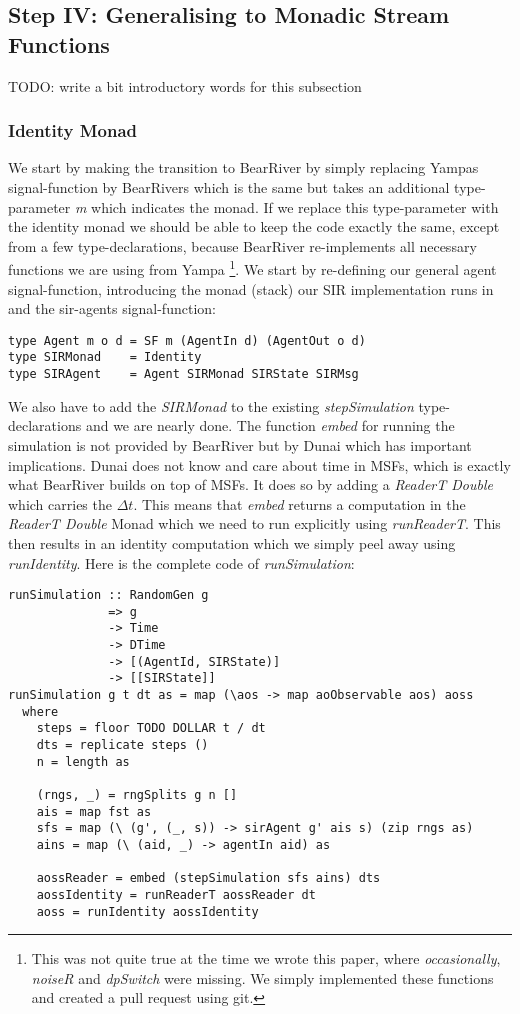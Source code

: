 \subsection{Step IV: Generalising to Monadic Stream Functions}
TODO: write a bit introductory words for this subsection

\subsubsection{Identity Monad}
We start by making the transition to BearRiver by simply replacing Yampas signal-function by BearRivers which is the same but takes an additional type-parameter \textit{m} which indicates the monad. If we replace this type-parameter with the identity monad we should be able to keep the code exactly the same, except from a few type-declarations, because BearRiver re-implements all necessary functions we are using from Yampa \footnote{This was not quite true at the time we wrote this paper, where \textit{occasionally}, \textit{noiseR} and \textit{dpSwitch} were missing. We simply implemented these functions and created a pull request using git.}.
We start by re-defining our general agent signal-function, introducing the monad (stack) our SIR implementation runs in and the sir-agents signal-function:

\begin{verbatim}
type Agent m o d = SF m (AgentIn d) (AgentOut o d)
type SIRMonad    = Identity
type SIRAgent    = Agent SIRMonad SIRState SIRMsg
\end{verbatim}

We also have to add the \textit{SIRMonad} to the existing \textit{stepSimulation} type-declarations and we are nearly done. The function \textit{embed} for running the simulation is not provided by BearRiver but by Dunai which has important implications. Dunai does not know and care about time in MSFs, which is exactly what BearRiver builds on top of MSFs. It does so by adding a \textit{ReaderT Double} which carries the $\Delta t$. This means that \textit{embed} returns a computation in the \textit{ReaderT Double} Monad which we need to run explicitly using \textit{runReaderT}. This then results in an identity computation which we simply peel away using \textit{runIdentity}. Here is the complete code of \textit{runSimulation}:

\begin{verbatim}
runSimulation :: RandomGen g
              => g 
              -> Time 
              -> DTime 
              -> [(AgentId, SIRState)] 
              -> [[SIRState]]
runSimulation g t dt as = map (\aos -> map aoObservable aos) aoss
  where
    steps = floor TODO DOLLAR t / dt
    dts = replicate steps ()
    n = length as

    (rngs, _) = rngSplits g n []
    ais = map fst as
    sfs = map (\ (g', (_, s)) -> sirAgent g' ais s) (zip rngs as)
    ains = map (\ (aid, _) -> agentIn aid) as

    aossReader = embed (stepSimulation sfs ains) dts
    aossIdentity = runReaderT aossReader dt
    aoss = runIdentity aossIdentity
\end{verbatim}

